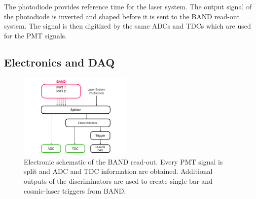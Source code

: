 \documentclass[3p,final,twocolumn]{elsarticle}
\begin{document}
The photodiode provides reference time for the laser system. The output
signal of the photodiode is inverted and shaped before it is sent to
the BAND read-out system. The signal is then digitized by the same ADCs and
TDCs which are used for the PMT signals.





\subsection{Electronics and DAQ}
\begin{figure}[tb]
	\centering
	\includegraphics[width=0.49\textwidth]{electronics-diag.pdf}
	\caption{Electronic schematic of the BAND read-out. Every PMT signal is split and ADC and TDC information are obtained. Additional outputs of the discriminators are used to create single bar and cosmic-laser triggers from BAND.}
	\label{fig:electronic-diag}
\end{figure}
\end{document}
